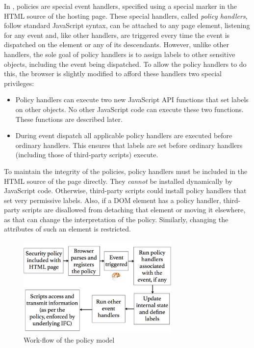 In {\sys}, policies are special event handlers, specified using a
special marker in the HTML source of the hosting page. These special
handlers, called \emph{policy handlers}, follow standard JavaScript
syntax, can be attached to any page element, listening for any event
and, like other handlers, are triggered every time the event is
dispatched on the element or any of its descendants. However, unlike
other handlers, the sole goal of policy handlers is to assign labels
to other sensitive objects, including the event being dispatched. To
allow the policy handlers to do this, the browser is slightly modified 
to afford these handlers two special privileges:
\begin{itemize}
\item Policy handlers can execute two new JavaScript API functions
  that set labels on other objects. No other JavaScript code can
  execute these two functions. These functions are described later.
\item During event dispatch all applicable policy handlers are executed
  before ordinary handlers. This ensures that labels are set before
  ordinary handlers (including those of third-party scripts) execute.
\end{itemize}
To maintain the integrity of the policies, policy handlers must be
included in the HTML source of the page directly. They \emph{cannot}
be installed dynamically by JavaScript code. Otherwise, third-party
scripts could install policy handlers that set very permissive labels.
Also, if a DOM element has a policy handler, third-party scripts are
disallowed from detaching that element or moving it elsewhere, as that 
can change the interpretation of the policy. Similarly, changing the
attributes of such an element is restricted.

\begin{figure}[tb]
  \centering \includegraphics[width=8cm]{chapters/browser/webpol/Model.pdf} \caption{Work-flow
  of the {\sys} policy model} \label{fig:model}
\end{figure}

